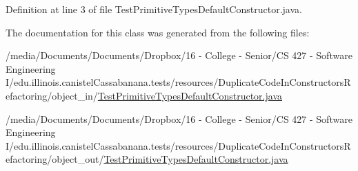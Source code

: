 Definition at line 3 of file TestPrimitiveTypesDefaultConstructor.java.



The documentation for this class was generated from the following files:\begin{DoxyCompactItemize}
\item 
/media/Documents/Documents/Dropbox/16 -\/ College -\/ Senior/CS 427 -\/ Software Engineering I/edu.illinois.canistelCassabanana.tests/resources/DuplicateCodeInConstructorsRefactoring/object\_\-in/\hyperlink{object__in_2TestPrimitiveTypesDefaultConstructor_8java}{TestPrimitiveTypesDefaultConstructor.java}\item 
/media/Documents/Documents/Dropbox/16 -\/ College -\/ Senior/CS 427 -\/ Software Engineering I/edu.illinois.canistelCassabanana.tests/resources/DuplicateCodeInConstructorsRefactoring/object\_\-out/\hyperlink{object__out_2TestPrimitiveTypesDefaultConstructor_8java}{TestPrimitiveTypesDefaultConstructor.java}\end{DoxyCompactItemize}
